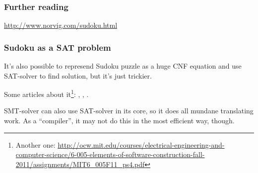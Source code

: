\subsubsection{Further reading}

\url{http://www.norvig.com/sudoku.html}

\subsubsection{Sudoku as a \ac{SAT} problem}

It's also possible to represend Sudoku puzzle as a huge \ac{CNF} equation and use \ac{SAT}-solver to find solution, but it's just trickier.

Some articles about it\footnote{Another one: \url{http://ocw.mit.edu/courses/electrical-engineering-and-computer-science/6-005-elements-of-software-construction-fall-2011/assignments/MIT6_005F11_ps4.pdf}}: \cite{Sudoku1}, \cite{Sudoku2}, \cite{Sudoku3}.

\ac{SMT}-solver can also use \ac{SAT}-solver in its core, so it does all mundane translating work.
As a ``compiler'', it may not do this in the most efficient way, though.

